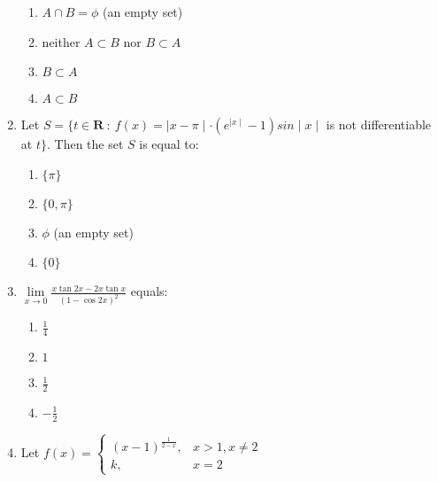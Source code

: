 \documentclass[journal,12pt,twocolumn]{IEEEtran}
\begin{document}
\begin{enumerate}[1.]
\begin{enumerate}[(1)]

\item $
A \cap B = \phi $ (an empty set)

\item neither $ A \subset B $ nor $ B \subset A $

\item $ B \subset A $

\item $ A \subset B $

\end{enumerate}

\item Let $ S= \lbrace  t \in \textbf{R} \ : \ f(x)=\mid x - \pi \mid \cdot (e^{\mid x \mid}-1) sin \mid x \mid $ is not differentiable at $t \rbrace $. Then the set $S$ is equal to:

\begin{enumerate}[(1)]

\item $ \lbrace \pi \rbrace $

\item $ \lbrace 0, \pi \rbrace $

\item $ \phi $ (an empty set)

\item $ \lbrace 0 \rbrace $

\end{enumerate}


\item  $\lim\limits_{x \to 0}\frac{x \tan 2x - 2x \tan x}{(1-\cos 2x)^2} $ equals: 


\begin{enumerate}[(1)]
 
\item $
\frac{1}{4}
$

\item $
1
$

\item $
\frac{1}{2}
$

\item $
-\frac{1}{2}
$


\end{enumerate}

\item Let 
$ 
f(x)=\begin{cases}
(x-1)^{\frac{1}{2-x}},& x>1,x \neq2 \\
k,& x=2
\end{cases}
$ \\



\end{enumerate}
\end{document}
